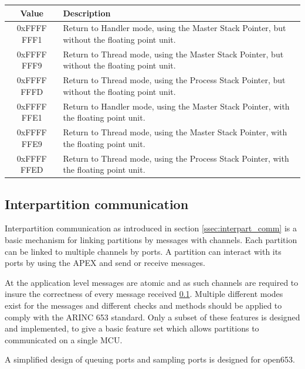 \begin{table}[H]

	\centering
	\begin{tabular}{|c|p{10cm}|}
		\hline
		Value			&	Description 	\\
		\hline
		0xFFFF FFF1 	&	Return to Handler mode, using the Master Stack Pointer, but without the floating point unit.	\\
		\hline
		0xFFFF FFF9		&	Return to Thread mode, using the Master Stack Pointer, but without the floating point unit.		\\
		\hline
		0xFFFF FFFD		&	Return to Thread mode, using the Process Stack Pointer, but without the floating point unit.	\\
		\hline
		0xFFFF FFE1		&	Return to Handler mode, using the Master Stack Pointer, with the floating point unit.			\\
		\hline
		0xFFFF FFE9		&	Return to Thread mode, using the Master Stack Pointer, with the floating point unit.			\\
		\hline
		0xFFFF FFED		&	Return to Thread mode, using the Process Stack Pointer, with the floating point unit.			\\
		\hline
	\end{tabular}
	\label{tab:exc-return}
\end{table}

\subsection{Interpartition communication}
Interpartition communication as introduced in section \ref{ssec:interpart_comm} is a basic mechanism for linking partitions by messages with channels.
Each partition can be linked to multiple channels by ports.
A partition can interact with its ports by using the APEX and send or receive messages.

At the application level messages are atomic and as such channels are required to insure the correctness of every message received \ref{}.
Multiple different modes exist for the messages and different checks and methods should be applied to comply with the ARINC 653 standard.
Only a subset of these features is designed and implemented,
to give a basic feature set which allows partitions to communicated on a single MCU.

A simplified design of queuing ports and sampling ports is designed for open653.

